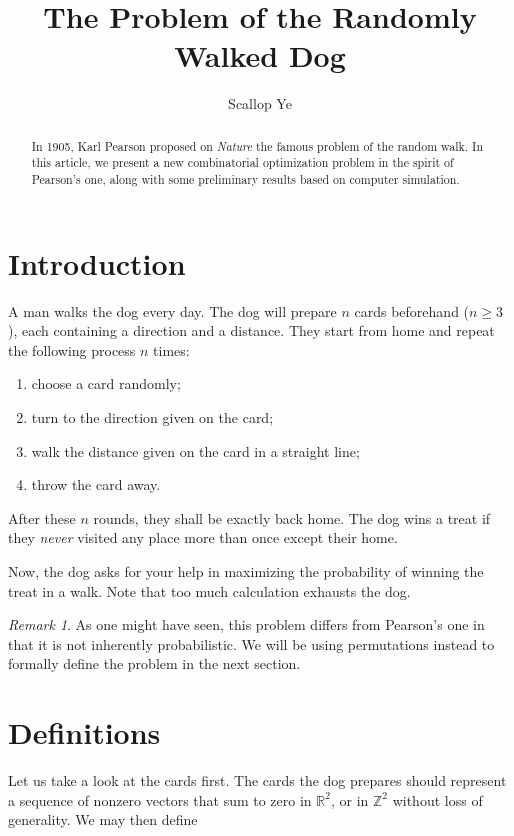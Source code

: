 \documentclass{amsart}
\title{The Problem of the Randomly Walked Dog}
\author{Scallop Ye}
\theoremstyle{definition}
\theoremstyle{problem}
\theoremstyle{remark}
\newtheorem*{remark}{Remark}
\begin{document}
\begin{abstract}
    In 1905, Karl Pearson \cite{pearson} proposed on \emph{Nature} the
    famous problem of the random walk. In this article, we present a new
    combinatorial optimization problem in the spirit of Pearson's one,
    along with some preliminary results based on computer simulation.
\end{abstract}

\maketitle

\section{Introduction}

A man walks the dog every day. The dog will prepare $n$ cards beforehand ($n\ge3$),
each containing a direction and a distance.
They start from home and repeat the following process $n$ times:

\begin{enumerate}
    \item choose a card randomly;
    \item turn to the direction given on the card;
    \item walk the distance given on the card in a straight line;
    \item throw the card away.
\end{enumerate}

After these $n$ rounds, they shall be exactly back home. The dog wins a treat
if they \emph{never} visited any place more than once except their home.

Now, the dog asks for your help in maximizing the probability of winning the
treat in a walk. Note that too much calculation exhausts the dog.

\begin{remark}
    As one might have seen, this problem differs from Pearson’s one in that
    it is not inherently probabilistic. We will be using permutations
    instead to formally define the problem in the next section.
\end{remark}

\section{Definitions}

Let us take a look at the cards first. The cards the dog prepares should represent
a sequence of nonzero vectors that sum to zero in $\mathbb{R}^2$, or in $\mathbb{Z}^2$
without loss of generality. We may then define
\end{document}
